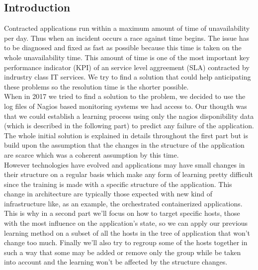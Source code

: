 \documentclass[10pt,a4paper,oneside]{article}
\begin{document}
\begin{multicols}{2}
\section{Introduction}
Contracted applications run within a maximum amount of time of unavailability per day. Thus when an incident occurs a race against time begins. The issue has to be diagnosed and fixed as fast as possible because this time is taken on the whole unavailability time. This amount of time is one of the most important key performance indicator (KPI) of an service level aggreement (SLA) contracted by indrustry class IT services. We try to find a solution that could help anticipating these problems so the resolution time is the shorter possible.
\\
When in 2017 we tried to find a solution to the problem, we decided to use the log files of Nagios based monitoring systems we had access to. Our thougth was that we could establish a learning process using only the nagios disponibility data (which is described in the following part) to predict any failure of the application. The whole initial solution is explained in details throughout the first part but is build upon the assumption that the changes in the structure of the application are scarce which was a coherent assumption by this time.
\\ However technologies have evolved and applications may have small changes in their structure on a regular basis which make any form of learning pretty difficult since the training is made with a specific structure of the application. This change in architecture are typically those expected with new kind of infrastructure like, as an example, the orchestrated containerized applications. This is why in a second part we'll focus on how to target specific hosts, those with the most influence on the application's state, so we can apply our previous learning method on a subset of all the hosts in the tree of application that won't change too much. Finally we'll also try to regroup some of the hosts together in such a way that some may be added or remove only the group while be taken into account and the learning won't be affected by the structure changes.
\end{multicols}
\end{document}
